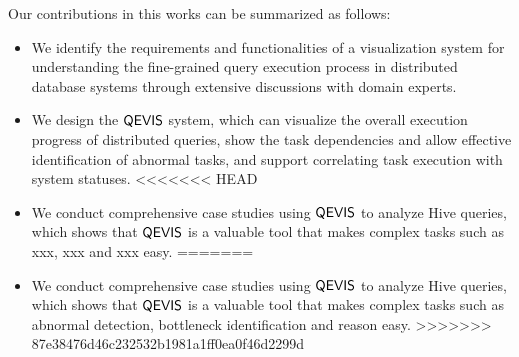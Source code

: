 Our contributions in this works can be summarized as follows:
\begin{itemize}
	\item We identify the requirements and functionalities of a visualization system for understanding the fine-grained query execution process in distributed database systems through extensive discussions with domain experts.   
	\item We design the $\mathsf{QEVIS}$ system, which can visualize the overall execution progress of distributed queries, show the task dependencies and allow effective identification of abnormal tasks, and support correlating task execution with system statuses.
<<<<<<< HEAD
	\item We conduct comprehensive case studies using $\mathsf{QEVIS}$ to analyze Hive queries, which shows that $\mathsf{QEVIS}$ is a valuable tool that makes complex tasks such as xxx, xxx and xxx easy.
=======
	\item We conduct comprehensive case studies using $\mathsf{QEVIS}$ to analyze Hive queries, which shows that $\mathsf{QEVIS}$ is a valuable tool that makes complex tasks such as abnormal detection, bottleneck identification and reason easy.
>>>>>>> 87e38476d46c232532b1981a1ff0ea0f46d2299d
\end{itemize}


